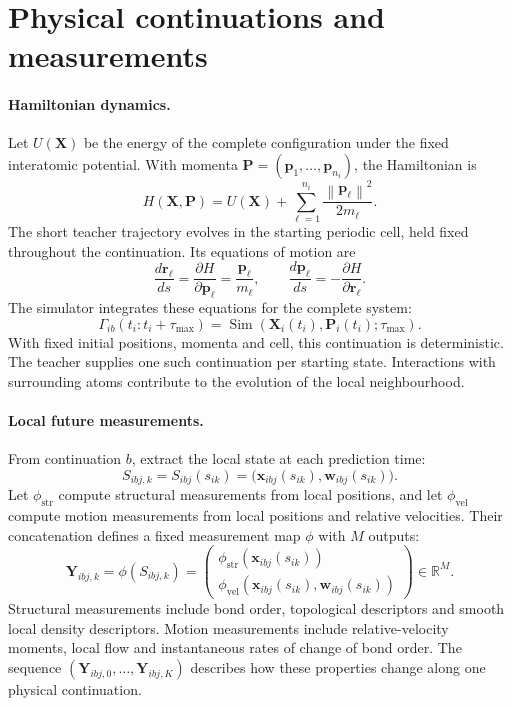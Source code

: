 \documentclass[11pt,a4paper]{article}
\newcommand{\R}{\mathbb R}
\newcommand{\norm}[1]{\left\lVert #1\right\rVert}
\newcommand{\x}{\mathbf x}
\newcommand{\X}{\mathbf X}
\newcommand{\Pp}{\mathbf P}
\newcommand{\Y}{\mathbf Y}
\newcommand{\Sim}{\operatorname{Sim}}
\begin{document}
\section{Physical continuations and measurements}

\paragraph{Hamiltonian dynamics.}
Let $U(\X)$ be the energy of the complete configuration under the fixed
interatomic potential. With momenta $\Pp=(\mathbf p_1,\ldots,\mathbf p_{n_i})$,
the Hamiltonian is
\[
\boxed{H(\X,\Pp)=U(\X)+\sum_{\ell=1}^{n_i}
\frac{\norm{\mathbf p_\ell}^2}{2m_\ell}.}
\]
The short teacher trajectory evolves in the starting periodic cell, held fixed
throughout the continuation. Its equations of motion are
\[
\frac{d\mathbf r_\ell}{ds}=\frac{\partial H}{\partial\mathbf p_\ell}
=\frac{\mathbf p_\ell}{m_\ell},
\qquad
\frac{d\mathbf p_\ell}{ds}=-\frac{\partial H}{\partial\mathbf r_\ell}.
\]
The simulator integrates these equations for the complete system:
\[
\Gamma_{ib}(t_i:t_i+\tau_{\max})
=\Sim\!\left(\X_i(t_i),\Pp_i(t_i);\tau_{\max}\right).
\]
With fixed initial positions, momenta and cell, this continuation is
deterministic. The teacher supplies one such continuation per starting state.
Interactions with surrounding atoms contribute to the evolution of the local
neighbourhood.

\paragraph{Local future measurements.}
From continuation $b$, extract the local state at each prediction time:
\[
S_{ibj,k}=S_{ibj}(s_{ik})
=\bigl(\x_{ibj}(s_{ik}),\mathbf w_{ibj}(s_{ik})\bigr).
\]
Let $\phi_{\mathrm{str}}$ compute structural measurements from local positions,
and let $\phi_{\mathrm{vel}}$ compute motion measurements from local positions
and relative velocities. Their concatenation defines a fixed measurement map
$\phi$ with $M$ outputs:
\[
\boxed{
\Y_{ibj,k}=\phi(S_{ibj,k})
=\begin{pmatrix}
\phi_{\mathrm{str}}(\x_{ibj}(s_{ik}))\\
\phi_{\mathrm{vel}}(\x_{ibj}(s_{ik}),\mathbf w_{ibj}(s_{ik}))
\end{pmatrix}\in\R^M.
}
\]
Structural measurements include bond order, topological descriptors and smooth
local density descriptors. Motion measurements include relative-velocity
moments, local flow and instantaneous rates of change of bond order.
The sequence $(\Y_{ibj,0},\ldots,\Y_{ibj,K})$ describes how these properties
change along one physical continuation.
\end{document}
